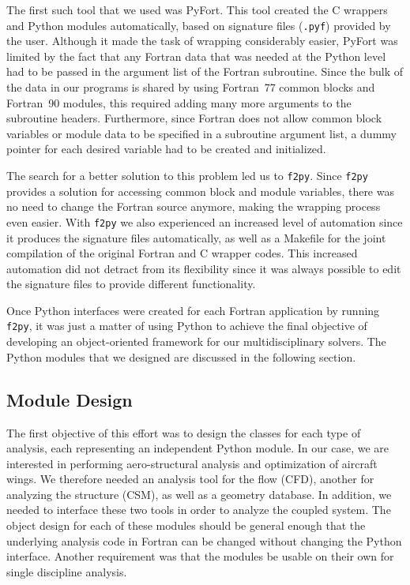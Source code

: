 \documentclass[twocolumn]{article}
\newcommand{\fpy}{\texttt{f2py}\xspace}
\begin{document}
The first such tool that we used was PyFort.  This tool created the C
wrappers and Python modules automatically, based on signature files
(\texttt{.pyf}) provided by the user.  Although it made the task of
wrapping considerably easier, PyFort was limited by the fact that any
Fortran data that was needed at the Python level had to be passed in
the argument list of the Fortran subroutine.  Since the bulk of the
data in our programs is shared by using Fortran~77 common blocks and
Fortran~90 modules, this required adding many more arguments to the
subroutine headers.  Furthermore, since Fortran does not allow common
block variables or module data to be specified in a subroutine
argument list, a dummy pointer for each desired variable had to be
created and initialized.

The search for a better solution to this problem led us to \fpy.
Since \fpy provides a solution for accessing common block and module
variables, there was no need to change the Fortran source anymore,
making the wrapping process even easier.  With \fpy we also
experienced an increased level of automation since it produces the
signature files automatically, as well as a Makefile for the joint
compilation of the original Fortran and C wrapper codes. This increased
automation did not detract from its flexibility since it was always
possible to edit the signature files to provide different functionality.

Once Python interfaces were created for each Fortran application
by running \fpy, it was just a matter of using Python to achieve the
final objective of developing an object-oriented framework for our
multidisciplinary solvers. The Python modules that we designed are
discussed in the following section.


\subsection{Module Design}
\label{ssec:module}

The first objective of this effort was to design the classes for each
type of analysis, each representing an independent Python module. In
our case, we are interested in performing aero-structural analysis and
optimization of aircraft wings. We therefore needed an analysis tool
for the flow (CFD), another for analyzing the structure (CSM), as well
as a geometry database. In addition, we needed to interface these two
tools in order to analyze the coupled system. The object design for
each of these modules should be general enough that the underlying
analysis code in Fortran can be changed without changing the Python
interface.  Another requirement was that the modules be usable on
their own for single discipline analysis.
\end{document}
